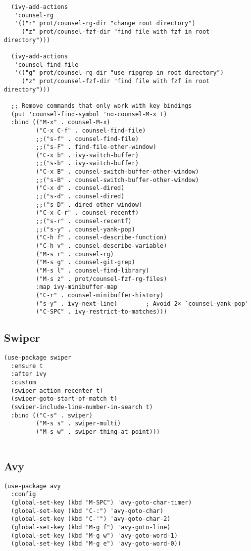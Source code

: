 \documentclass[12pt]{article}
\begin{document}
\begin{verbatim}
  (ivy-add-actions
   'counsel-rg
   '(("r" prot/counsel-rg-dir "change root directory")
     ("z" prot/counsel-fzf-dir "find file with fzf in root directory")))

  (ivy-add-actions
   'counsel-find-file
   '(("g" prot/counsel-rg-dir "use ripgrep in root directory")
     ("z" prot/counsel-fzf-dir "find file with fzf in root directory")))

  ;; Remove commands that only work with key bindings
  (put 'counsel-find-symbol 'no-counsel-M-x t)
  :bind (("M-x" . counsel-M-x)
         ("C-x C-f" . counsel-find-file)
         ;;("s-f" . counsel-find-file)
         ;;("s-F" . find-file-other-window)
         ("C-x b" . ivy-switch-buffer)
         ;;("s-b" . ivy-switch-buffer)
         ("C-x B" . counsel-switch-buffer-other-window)
         ;;("s-B" . counsel-switch-buffer-other-window)
         ("C-x d" . counsel-dired)
         ;;("s-d" . counsel-dired)
         ;;("s-D" . dired-other-window)
         ("C-x C-r" . counsel-recentf)
         ;;("s-r" . counsel-recentf)
         ;;("s-y" . counsel-yank-pop)
         ("C-h f" . counsel-describe-function)
         ("C-h v" . counsel-describe-variable)
         ("M-s r" . counsel-rg)
         ("M-s g" . counsel-git-grep)
         ("M-s l" . counsel-find-library)
         ("M-s z" . prot/counsel-fzf-rg-files)
         :map ivy-minibuffer-map
         ("C-r" . counsel-minibuffer-history)
         ("s-y" . ivy-next-line)        ; Avoid 2× `counsel-yank-pop'
         ("C-SPC" . ivy-restrict-to-matches)))
\end{verbatim}

\subsection{Swiper}
\label{sec:orge5afac3}
\begin{verbatim}
(use-package swiper
  :ensure t
  :after ivy
  :custom
  (swiper-action-recenter t)
  (swiper-goto-start-of-match t)
  (swiper-include-line-number-in-search t)
  :bind (("C-s" . swiper)
         ("M-s s" . swiper-multi)
         ("M-s w" . swiper-thing-at-point)))


\end{verbatim}

\subsection{Avy}
\label{sec:orgcee26b6}


\begin{verbatim}
(use-package avy
  :config
  (global-set-key (kbd "M-SPC") 'avy-goto-char-timer)
  (global-set-key (kbd "C-:") 'avy-goto-char)
  (global-set-key (kbd "C-'") 'avy-goto-char-2)
  (global-set-key (kbd "M-g f") 'avy-goto-line)
  (global-set-key (kbd "M-g w") 'avy-goto-word-1)
  (global-set-key (kbd "M-g e") 'avy-goto-word-0))

\end{verbatim}
\end{document}
